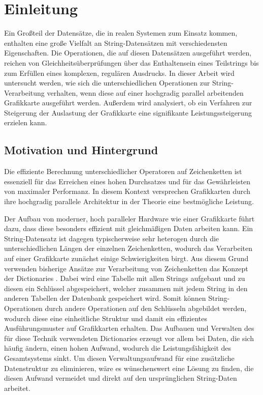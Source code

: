 \chapter{Einleitung}

Ein Großteil der Datensätze, die in realen Systemen zum Einsatz kommen, enthalten eine große Vielfalt an String-Datensätzen mit verschiedensten Eigenschaften.
Die Operationen, die auf diesen Datensätzen ausgeführt werden, reichen von Gleichheitsüberprüfungen über das Enthaltensein eines Teilstrings bis zum Erfüllen eines komplexen, regulären Ausdrucks.
In dieser Arbeit wird untersucht werden, wie sich die unterschiedlichen Operationen zur String-Verarbeitung verhalten, wenn diese auf einer hochgradig parallel arbeitenden Grafikkarte ausgeführt werden.
Außerdem wird analysiert, ob ein Verfahren zur Steigerung der Auslastung der Grafikkarte eine signifikante Leistungssteigerung erzielen kann.

\section{Motivation und Hintergrund}

Die effiziente Berechnung unterschiedlicher Operatoren auf Zeichenketten ist essenziell für das Erreichen eines hohen Durchsatzes und für das Gewährleisten von maximaler Performanz.
In diesem Kontext versprechen Grafikkarten durch ihre hochgradig parallele Architektur in der Theorie eine bestmögliche Leistung.

Der Aufbau von moderner, hoch paralleler Hardware wie einer Grafikkarte führt dazu, dass diese besonders effizient mit gleichmäßigen Daten arbeiten kann.
Ein String-Datensatz ist dagegen typischerweise sehr heterogen durch die unterschiedlichen Längen der einzelnen Zeichenketten, wodurch das Verarbeiten auf einer Grafikkarte zunächst einige Schwierigkeiten birgt.
Aus diesem Grund verwenden bisherige Ansätze zur Verarbeitung von Zeichenketten das Konzept der Dictionaries \cite{Mueller2014}.
Dabei wird eine Tabelle mit allen Strings aufgebaut und zu diesen ein Schlüssel abgespeichert, welcher zusammen mit jedem String in den anderen Tabellen der Datenbank gespeichert wird.
Somit können String-Operationen durch andere Operationen auf den Schlüsseln abgebildet werden, wodurch diese eine einheitliche Struktur und damit ein effizientes Ausführungsmuster auf Grafikkarten erhalten.
Das Aufbauen und Verwalten des für diese Technik verwendeten Dictionaries erzeugt vor allem bei Daten, die sich häufig ändern, einen hohen Aufwand, wodurch die Leistungsfähigkeit des Gesamtsystems sinkt.
Um diesen Verwaltungsaufwand für eine zusätzliche Datenstruktur zu eliminieren, wäre es wünschenswert eine Lösung zu finden, die diesen Aufwand vermeidet und direkt auf den ursprünglichen String-Daten arbeitet.

